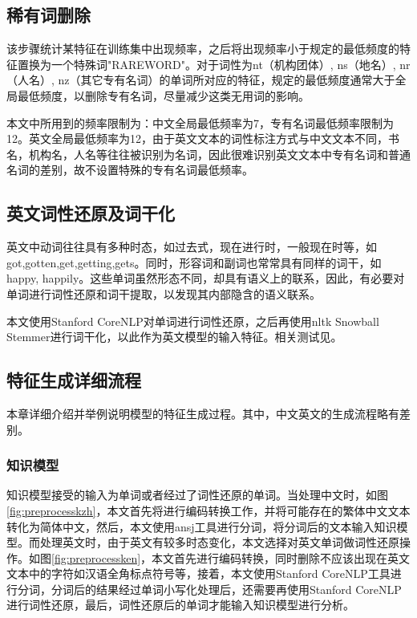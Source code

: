 \subsection{稀有词删除}
该步骤统计某特征在训练集中出现频率，之后将出现频率小于规定的最低频度的特征置换为一个特殊词"RAREWORD"。对于词性为nt（机构团体）, ns（地名）, nr（人名）, nz（其它专有名词）的单词所对应的特征，规定的最低频度通常大于全局最低频度，以删除专有名词，尽量减少这类无用词的影响。


本文中所用到的频率限制为：中文全局最低频率为7，专有名词最低频率限制为12。英文全局最低频率为12，由于英文文本的词性标注方式与中文文本不同，书名，机构名，人名等往往被识别为名词，因此很难识别英文文本中专有名词和普通名词的差别，故不设置特殊的专有名词最低频率。

\subsection{英文词性还原及词干化}
英文中动词往往具有多种时态，如过去式，现在进行时，一般现在时等，如got,gotten,get,getting,gets。同时，形容词和副词也常常具有同样的词干，如happy, happily。这些单词虽然形态不同，却具有语义上的联系，因此，有必要对单词进行词性还原和词干提取，以发现其内部隐含的语义联系。\par
本文使用Stanford CoreNLP对单词进行词性还原，之后再使用nltk Snowball Stemmer进行词干化，以此作为英文模型的输入特征。相关测试见。

\subsection{特征生成详细流程}
本章详细介绍并举例说明模型的特征生成过程。其中，中文英文的生成流程略有差别。
\subsubsection{知识模型}
知识模型接受的输入为单词或者经过了词性还原的单词。当处理中文时，如图\ref{fig:preprocesskzh}，本文首先将进行编码转换工作，并将可能存在的繁体中文文本转化为简体中文，然后，本文使用ansj工具进行分词，将分词后的文本输入知识模型。而处理英文时，由于英文有较多时态变化，本文选择对英文单词做词性还原操作。如图\ref{fig:preprocessken}，本文首先进行编码转换，同时删除不应该出现在英文文本中的字符如汉语全角标点符号等，接着，本文使用Stanford CoreNLP工具进行分词，分词后的结果经过单词小写化处理后，还需要再使用Stanford CoreNLP进行词性还原，最后，词性还原后的单词才能输入知识模型进行分析。



